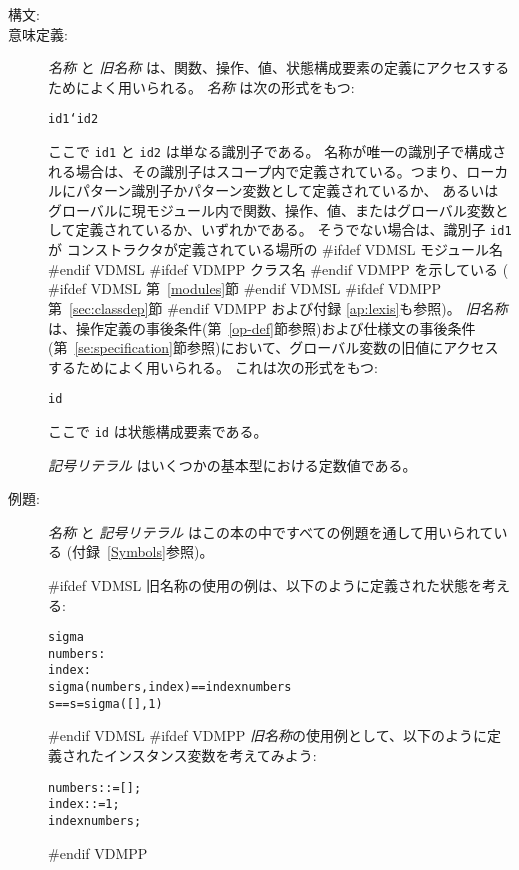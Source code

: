 \documentclass[\pformat,12pt]{jarticle}
\begin{document}
\begin{description}
\item[構文:]




\item[意味定義:] {\it 名称\/} と {\it 旧名称\/} は、関数、操作、値、状態構成要素の定義にアクセスするためによく用いられる。
 {\it 名称\/} は次の形式をもつ:
  \begin{alltt}
    id1`id2
  \end{alltt}
ここで {\tt id1} と {\tt id2} は単なる識別子である。
名称が唯一の識別子で構成される場合は、その識別子はスコープ内で定義されている。つまり、ローカルにパターン識別子かパターン変数として定義されているか、
あるいはグローバルに現モジュール内で関数、操作、値、またはグローバル変数として定義されているか、いずれかである。
そうでない場合は、識別子 {\tt id1}が
コンストラクタが定義されている場所の
#ifdef VDMSL
モジュール名
#endif VDMSL
#ifdef VDMPP
クラス名
#endif VDMPP
を示している (
#ifdef VDMSL
  第~\ref{modules}節
#endif VDMSL
#ifdef VDMPP
第~\ref{sec:classdep}節
#endif VDMPP
および付録 \ref{ap:lexis}も参照)。
 {\it 旧名称\/} は、操作定義の事後条件(第~\ref{op-def}節参照)および仕様文の事後条件(第~\ref{se:specification}節参照)において、グローバル変数の旧値にアクセスするためによく用いられる。
これは次の形式をもつ:

  \begin{alltt} 
    id~ 
  \end{alltt} 
 ここで {\tt id} は状態構成要素である。

  {\it 記号リテラル\/} はいくつかの基本型における定数値である。

\item[例題:] {\it 名称} と {\it 記号リテラル\/} はこの本の中ですべての例題を通して用いられている (付録~\ref{Symbols}参照)。


#ifdef VDMSL
  旧名称の使用の例は、以下のように定義された状態を考える:
  \begin{alltt}
     sigma 
      numbers : 
      index   : 
      sigma(numbers, index) == index  numbers
     s == s = sigma([], 1)
  \end{alltt}
#endif VDMSL
#ifdef VDMPP
 {\it 旧名称}の使用例として、以下のように定義されたインスタンス変数を考えてみよう:
  \begin{alltt}
      numbers:  := [];
      index  :  := 1;
     index  numbers;
  \end{alltt}
#endif VDMPP


\end{description}
\end{document}
